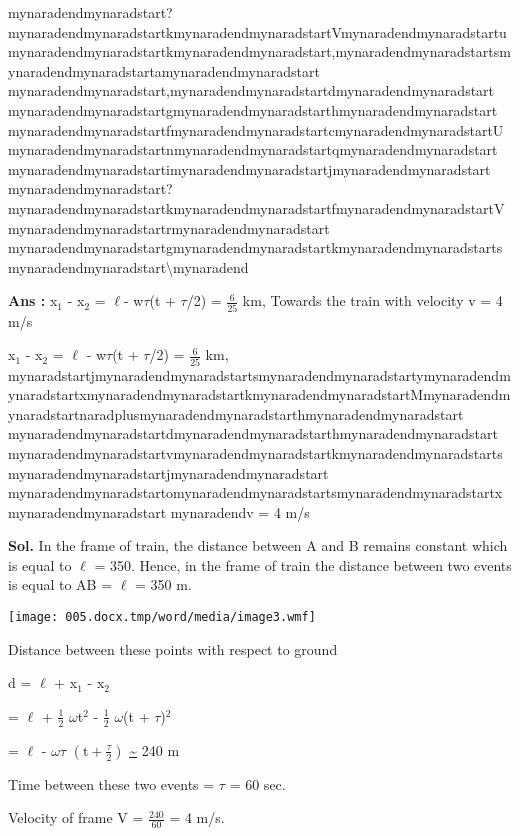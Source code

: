 \documentclass{scrbook}
\begin{document}
mynaradendmynaradstart?mynaradendmynaradstartkmynaradendmynaradstartVmynaradendmynaradstartumynaradendmynaradstartkmynaradendmynaradstart,mynaradendmynaradstartsmynaradendmynaradstartamynaradendmynaradstart mynaradendmynaradstart,mynaradendmynaradstartdmynaradendmynaradstart mynaradendmynaradstartgmynaradendmynaradstarthmynaradendmynaradstart mynaradendmynaradstartfmynaradendmynaradstartcmynaradendmynaradstartUmynaradendmynaradstartnmynaradendmynaradstartqmynaradendmynaradstart mynaradendmynaradstartimynaradendmynaradstartjmynaradendmynaradstart mynaradendmynaradstart?mynaradendmynaradstartkmynaradendmynaradstartfmynaradendmynaradstartVmynaradendmynaradstartrmynaradendmynaradstart mynaradendmynaradstartgmynaradendmynaradstartkmynaradendmynaradstartsmynaradendmynaradstart\textbackslash mynaradend

\textbf{Ans :}  x$_{1}$ - x$_{2}$ = ${\ell}$\privateuse{}- w${\tau}$(t + ${\tau}$/2) = $\frac{6}{25}$ km, Towards the train with velocity v = 4 m/s

x$_{1}$ - x$_{2}$ = ${\ell}$ - w${\tau}$(t + ${\tau}$/2) = $\frac{6}{25}$ km, mynaradstartjmynaradendmynaradstartsmynaradendmynaradstartymynaradendmynaradstartxmynaradendmynaradstartkmynaradendmynaradstartMmynaradendmynaradstartnaradplusmynaradendmynaradstarthmynaradendmynaradstart mynaradendmynaradstartdmynaradendmynaradstarthmynaradendmynaradstart mynaradendmynaradstartvmynaradendmynaradstartkmynaradendmynaradstartsmynaradendmynaradstartjmynaradendmynaradstart mynaradendmynaradstartomynaradendmynaradstartsmynaradendmynaradstartxmynaradendmynaradstart mynaradendv = 4 m/s

\textbf{Sol.} In the frame of train, the distance between A and B remains constant which is equal to ${\ell}$ = 350. Hence, in the frame of train the distance between two events is equal to AB = ${\ell}$ = 350 m.

\texttt{[image: 005.docx.tmp/word/media/image3.wmf]}

Distance between these points with respect to ground 

 d = ${\ell}$ + x$_{1}$ - x$_{2}$

 = ${\ell}$ + $\frac{1}{2}$ ${\omega}$t$^{2}$ - $\frac{1}{2}$ ${\omega}$(t + ${\tau}$)$^{2}$ 

 = ${\ell}$ - ${\omega}{\tau}$ $\left(\mathrm{t}+\frac{\tau }{2}\right)$ \underline{\textasciitilde{}} 240 m

Time between these two events = ${\tau}$ = 60 sec. 

Velocity of frame V = $\frac{240}{60}$ = 4 m/s.
\end{document}

